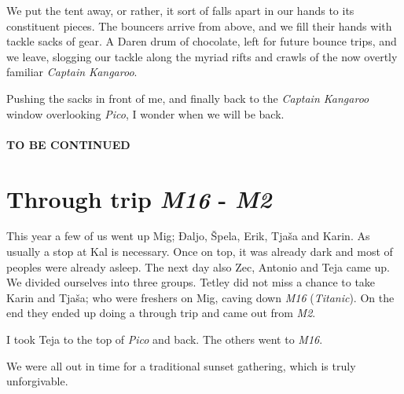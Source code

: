 We put the tent away, or rather, it sort of falls apart in our hands to
its constituent pieces. The bouncers arrive from above, and we fill
their hands with tackle sacks of gear. A Daren drum of chocolate, left
for future bounce trips, and we leave, slogging our tackle along the
myriad rifts and crawls of the now overtly familiar \emph{Captain
Kangaroo}.

Pushing the sacks in front of me, and finally back to the \emph{Captain
Kangaroo} window overlooking \emph{Pico}, I wonder when we will be back.


\hypertarget{to-be-continued}{%
\paragraph{TO BE CONTINUED}\label{to-be-continued}}


\hypertarget{through-trip-m16---m2}{%
\section{\texorpdfstring{Through trip \emph{M16} -
\emph{M2}}{Through trip M16 - M2}}\label{through-trip-m16---m2}}

This year a few of us went up Mig; Đaljo, Špela, Erik, Tjaša and Karin.
As usually a stop at Kal is necessary. Once on top, it was already dark
and most of peoples were already asleep. The next day also Zec, Antonio
and Teja came up. We divided ourselves into three groups. Tetley did not
miss a chance to take Karin and Tjaša; who were freshers on Mig, caving
down \emph{M16} (\emph{Titanic}). On the end they ended up doing a
through trip and came out from \emph{M2}.

I took Teja to the top of \emph{Pico} and back. The others went to
\emph{M16}.

We were all out in time for a traditional sunset gathering, which is
truly unforgivable.

